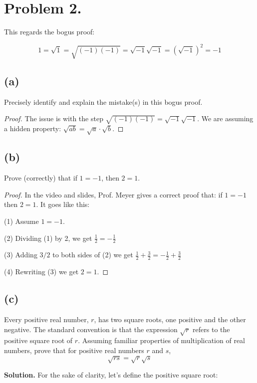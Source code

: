 \documentclass[14pt]{extarticle}
\begin{document}
\section{Problem 2.}
This regards the bogus proof:

$$
1 = \sqrt{1} = \sqrt{(-1)(-1)} = \sqrt{-1}\sqrt{-1} = (\sqrt{-1})^2 = -1
$$

\subsection{(a)}

Precisely identify and explain the mistake(s) in this bogus proof.

\begin{proof}
The issue is with the step $\sqrt{(-1)(-1)} = \sqrt{-1}\sqrt{-1}$. We are assuming a hidden property: $\sqrt{ab} = \sqrt{a}\cdot\sqrt{b}$.
\end{proof}

\subsection{(b)}

Prove (correctly) that if $1 = -1$, then $2 = 1$.

\begin{proof}
In the video and slides, Prof. Meyer gives a correct proof that: if $1 = -1$ then $2 = 1$. It goes like this:

(1) Assume $1 = -1$. 

(2) Dividing (1) by 2, we get $\frac{1}{2} = -\frac{1}{2}$

(3) Adding $3/2$ to both sides of (2) we get $\frac{1}{2}  + \frac{3}{2} = -\frac{1}{2} + \frac{3}{2}$

(4) Rewriting (3) we get $2 = 1$.
\end{proof}

\subsection{(c)}

Every positive real number, $r$, has two square roots, one positive and the other negative. The standard convention is that the expression $\sqrt{r}$ refers to the positive square root of $r$. Assuming familiar properties of multiplication of real numbers, prove that for positive real numbers $r$ and $s$,
$$
\sqrt{rs} = \sqrt{r}\sqrt{s}
$$

{\bf Solution.} For the sake of clarity, let's define the positive square root:
\end{document}
